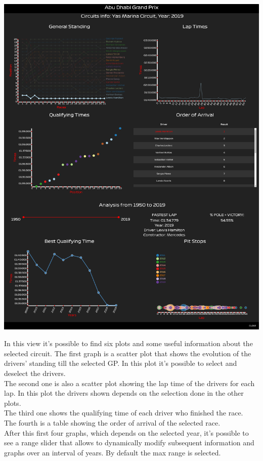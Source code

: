 \documentclass[11pt,twocolumn,letterpaper]{article}
\begin{document}
\begin{center}
	\centering
	\includegraphics[width=\columnwidth]{map-clicked}
\end{center}
In this view it's possible to find six plots and some useful information about the selected circuit.
The first graph is a scatter plot that shows the evolution of the drivers' standing till the selected GP. In this plot it's possible to select and deselect the drivers. \\
The second one is also a scatter plot showing the lap time of the drivers for each lap. In this plot the drivers shown depends on the selection done in the other plots.\\
The third one shows the qualifying time of each driver who finished the race. \\
The fourth is a table showing the order of arrival of the selected race. \\
After this first four graphs, which depends on the selected year, it's possible to see a range slider that allows to dynamically modify subsequent information and graphs over an interval of years. By default the max range is selected. \\
\end{document}
